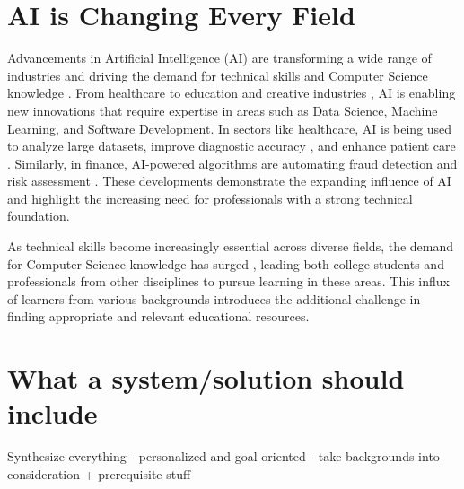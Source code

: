 \section{AI is Changing Every Field} 

Advancements in Artificial Intelligence (AI) are transforming a wide range of industries \cite{nature:2023} and driving the demand for technical skills and Computer Science knowledge \cite{tamayo:2023}. From healthcare \cite{saxena:2024} to education \cite{luckin:2016} and creative industries \cite{almamari:2024}, AI is enabling new innovations that require expertise in areas such as Data Science, Machine Learning, and Software Development. In sectors like healthcare, AI is being used to analyze large datasets, improve diagnostic accuracy \cite{lenharo:2023}, and enhance patient care \cite{ranjbar:2024}. Similarly, in finance, AI-powered algorithms are automating fraud detection and risk assessment \cite{shabir:2024}. These developments demonstrate the expanding influence of AI and highlight the increasing need for professionals with a strong technical foundation.

As technical skills become increasingly essential across diverse fields, the demand for Computer Science knowledge has surged \cite{bls:2024}, leading both college students and professionals from other disciplines to pursue learning in these areas. This influx of learners from various backgrounds introduces the additional challenge in finding appropriate and relevant educational resources.

\section{What a system/solution should include}

Synthesize everything 
- personalized and goal oriented
- take backgrounds into consideration + prerequisite stuff 
